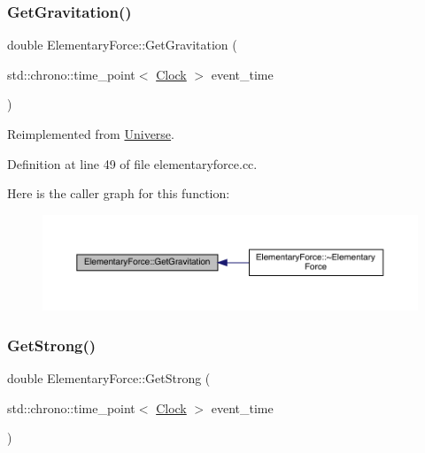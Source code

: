 \subsubsection{\texorpdfstring{Get\+Gravitation()}{GetGravitation()}}
{\footnotesize\ttfamily double Elementary\+Force\+::\+Get\+Gravitation (\begin{DoxyParamCaption}\item[{std\+::chrono\+::time\+\_\+point$<$ \hyperlink{universe_8h_a0ef8d951d1ca5ab3cfaf7ab4c7a6fd80}{Clock} $>$}]{event\+\_\+time }\end{DoxyParamCaption})\hspace{0.3cm}{\ttfamily [virtual]}}



Reimplemented from \hyperlink{class_universe_ab0404e774ee0ed66b597ff5b8e989446}{Universe}.



Definition at line 49 of file elementaryforce.\+cc.

Here is the caller graph for this function\+:
\nopagebreak
\begin{figure}[H]
\begin{center}
\leavevmode
\includegraphics[width=350pt]{class_elementary_force_a579afb8079668f0587096934d1de9c04_icgraph}
\end{center}
\end{figure}
\mbox{\label{class_elementary_force_aaa1cde27b1508831f67353eb39745a7e}} 
\subsubsection{\texorpdfstring{Get\+Strong()}{GetStrong()}}
{\footnotesize\ttfamily double Elementary\+Force\+::\+Get\+Strong (\begin{DoxyParamCaption}\item[{std\+::chrono\+::time\+\_\+point$<$ \hyperlink{universe_8h_a0ef8d951d1ca5ab3cfaf7ab4c7a6fd80}{Clock} $>$}]{event\+\_\+time }\end{DoxyParamCaption})\hspace{0.3cm}{\ttfamily [virtual]}}



